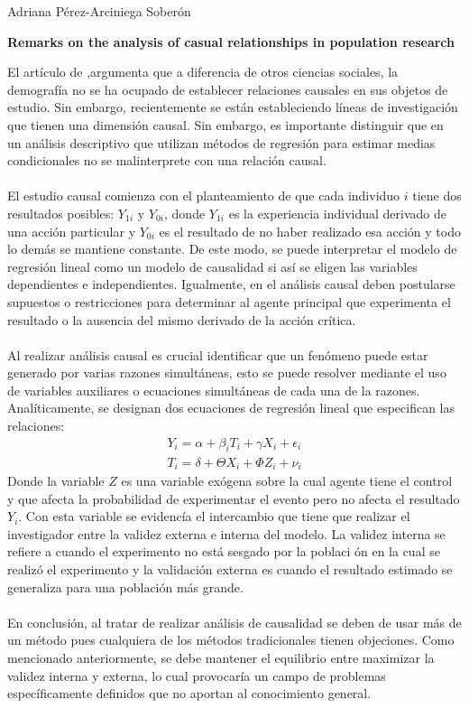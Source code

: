 \documentclass[11pt,spanish,letterpaper]{article}
\theoremstyle{plain}
\begin{document}
\begin{flushleft}
Adriana P\'erez-Arciniega Sober\'on
\end{flushleft}
\begin{center}
\textbf{Remarks on the analysis of casual relationships in population research}
\end{center}
El art\'iculo de \cite{moffitt2005remarks},argumenta que a diferencia de otros ciencias sociales, la demograf\'ia no se ha ocupado de establecer relaciones causales en sus objetos de estudio. Sin embargo, recientemente se est\'an estableciendo l\'ineas de investigaci\'on que tienen una dimensi\'on causal. Sin embargo, es importante distinguir que en un an\'alisis descriptivo que utilizan m\'etodos de regresi\'on para estimar medias condicionales no se malinterprete con una relaci\'on causal.\\
\\
El estudio causal comienza con el planteamiento de que cada individuo $i$ tiene dos resultados posibles: $Y_{1i}$ y $Y_{0i}$, donde $Y_{1i}$ es la experiencia individual derivado de una acci\'on particular y $Y_{0i}$ es el resultado de no haber realizado esa acci\'on y todo lo dem\'as se mantiene constante. De este modo, se puede interpretar el modelo de regresi\'on lineal como un modelo de causalidad si as\'i se eligen  las variables dependientes e independientes. Igualmente, en el an\'alisis causal deben postularse supuestos o restricciones para determinar al agente principal que experimenta el resultado o la ausencia del mismo derivado de la acci\'on cr\'itica.\\
\\
Al realizar an\'alisis causal es crucial identificar que un fen\'omeno puede estar generado por varias razones simult\'aneas, esto se puede resolver mediante el uso de variables auxiliares o ecuaciones simult\'aneas de cada una de la razones. Anal\'iticamente, se designan dos ecuaciones de regresi\'on lineal que especifican las relaciones:
\begin{align*}
Y_i = \alpha + \beta_i T_i + \gamma X_i + \epsilon_i\\
T_i=\delta+\Theta X_i + \Phi Z_i+\nu_i
\end{align*}
Donde la variable $Z$ es una variable ex\'ogena sobre la cual agente tiene el control y que afecta la probabilidad de experimentar el evento pero no afecta el resultado $Y_i$. Con esta variable se evidenc\'ia el intercambio que tiene que realizar el investigador entre la validez externa e interna del modelo. La validez interna se refiere a cuando el experimento no est\'a sesgado por la poblaci \'on en la cual se realiz\'o el experimento y la validaci\'on externa es cuando el resultado estimado se generaliza para una poblaci\'on m\'as grande.\\
\\
En conclusi\'on, al tratar de realizar an\'alisis de causalidad se deben de usar m\'as de un m\'etodo pues cualquiera de los m\'etodos tradicionales tienen objeciones. Como mencionado anteriormente, se debe mantener el equilibrio entre maximizar la validez interna y externa, lo cual provocar\'ia un campo de problemas espec\'ificamente definidos que no aportan al conocimiento general.


\end{document}
